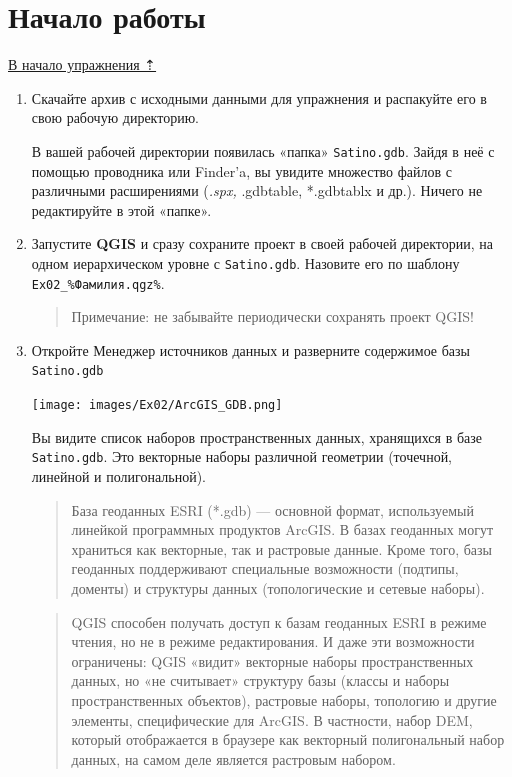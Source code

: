 \documentclass[
  12pt,
]{book}
\begin{document}
\hypertarget{map-design-quaternary-begin}{%
\section{Начало работы}\label{map-design-quaternary-begin}}

\protect\hyperlink{map-design-quaternary}{В начало упражнения ⇡}

\begin{enumerate}
\def\labelenumi{\arabic{enumi}.}
\item
  Скачайте архив с исходными данными для упражнения и распакуйте его в свою рабочую директорию.

  В вашей рабочей директории появилась «папка» \texttt{Satino.gdb}. Зайдя в неё с помощью проводника или Finder'a, вы увидите множество файлов с различными расширениями (\emph{.spx, }.gdbtable, *.gdbtablx и др.). Ничего не редактируйте в этой «папке».
\item
  Запустите \textbf{QGIS} и сразу сохраните проект в своей рабочей директории, на одном иерархическом уровне с \texttt{Satino.gdb}. Назовите его по шаблону \texttt{Ex02\_\%Фамилия.qgz\%}.

  \begin{quote}
  Примечание: не забывайте периодически сохранять проект QGIS!
  \end{quote}
\item
  Откройте Менеджер источников данных и разверните содержимое базы \texttt{Satino.gdb}

  \texttt{[image: images/Ex02/ArcGIS\_GDB.png]}

  Вы видите список наборов пространственных данных, хранящихся в базе \texttt{Satino.gdb}. Это векторные наборы различной геометрии (точечной, линейной и полигональной).

  \begin{quote}
  База геоданных ESRI (*.gdb) --- основной формат, используемый линейкой программных продуктов ArcGIS. В базах геоданных могут храниться как векторные, так и растровые данные. Кроме того, базы геоданных поддерживают специальные возможности (подтипы, доменты) и структуры данных (топологические и сетевые наборы).
  \end{quote}

  \begin{quote}
  QGIS способен получать доступ к базам геоданных ESRI в режиме чтения, но не в режиме редактирования. И даже эти возможности ограничены: QGIS «видит» векторные наборы пространственных данных, но «не считывает» структуру базы (классы и наборы пространственных объектов), растровые наборы, топологию и другие элементы, специфические для ArcGIS. В частности, набор DEM, который отображается в браузере как векторный полигональный набор данных, на самом деле является растровым набором.
  \end{quote}
\end{enumerate}
\end{document}
